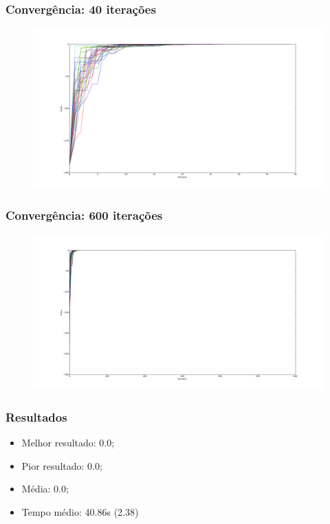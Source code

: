 \documentclass{beamer}
\begin{document}
\begin{frame}
\frametitle{Convergência: 40 iterações}
\begin{figure}
\includegraphics[width=1.0\linewidth]{convergence40.png}
\end{figure}
\end{frame}

\begin{frame}
\frametitle{Convergência: 600 iterações}
\begin{figure}
\includegraphics[width=1.0\linewidth]{convergence600.png}
\end{figure}
\end{frame}

\begin{frame}
\frametitle{Resultados}
\begin{itemize}
\item Melhor resultado: 0.0;
\item Pior resultado: 0.0;
\item Média: 0.0;
\item Tempo médio: 40.86s (2.38) 
\end{itemize}
\end{frame}
\end{document}
